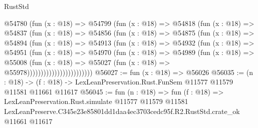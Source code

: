 \begin{lexlean}{RustStd}
\begin{coremodule}
                      @54780
                        (fun (x : @18) =>
                        @54799
                          (fun (x : @18) =>
                          @54818
                            (fun (x : @18) =>
                            @54837
                              (fun (x : @18) =>
                              @54856
                                (fun (x : @18) =>
                                @54875
                                  (fun (x : @18) =>
                                  @54894
                                    (fun (x : @18) =>
                                    @54913
                                      (fun (x : @18) =>
                                      @54932
                                        (fun (x : @18) =>
                                        @54951
                                          (fun (x : @18) =>
                                          @54970
                                            (fun (x : @18) =>
                                            @54989
                                              (fun (x : @18) =>
                                              @55008
                                                (fun (x : @18) =>
                                                @55027
                                                  (fun (x : @18) => @55978))))))))))))))))))))))))
@56027 := fun (x : @18) => @56026
@56035 := (n : @18) ->
  (f : @18) -> LexLeanPreservation.Rust.FunSem @11577 @11579 @11581 @11661 @11617
@56045 := fun (n : @18) =>
  fun (f : @18) =>
  LexLeanPreservation.Rust.simulate
    @11577
    @11579
    @11581
    LexLeanPreserve.C345e23e85801dd1daa4ec3703cedc95f.R2.RustStd.crate_ok
    @11661
    @11617
\end{coremodule}
\end{lexlean}
